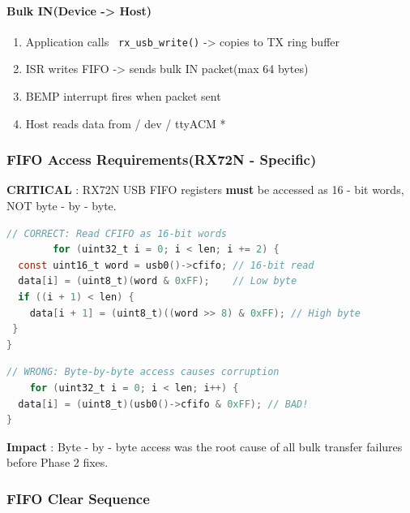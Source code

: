 \paragraph { Bulk IN(Device -> Host)}

\begin{enumerate}
\item Application calls \texttt { rx\_usb\_write()}
-> copies to TX ring buffer
\item ISR writes FIFO -> sends bulk IN packet(max 64 bytes)
\item BEMP interrupt fires when packet sent
\item Host reads data from / dev / ttyACM *
\end{enumerate}

\subsubsection{FIFO Access Requirements(RX72N - Specific)}

\textbf{CRITICAL} : RX72N USB FIFO registers \textbf{must} be accessed as 16 -
                    bit words,
    NOT byte - by -
        byte.

\begin{lstlisting}[language = C,
                    caption = {Correct FIFO Read(16 - bit access)},
                    label = {lst : fifo_read_correct}]
        // CORRECT: Read CFIFO as 16-bit words
        for (uint32_t i = 0; i < len; i += 2) {
  const uint16_t word = usb0()->cfifo; // 16-bit read
  data[i] = (uint8_t)(word & 0xFF);    // Low byte
  if ((i + 1) < len) {
    data[i + 1] = (uint8_t)((word >> 8) & 0xFF); // High byte
 }
}
\end{lstlisting}

\begin{lstlisting}[language = C,
                   caption = {Incorrect FIFO Read(causes data corruption)},
                   label = {lst : fifo_read_wrong}]
    // WRONG: Byte-by-byte access causes corruption
    for (uint32_t i = 0; i < len; i++) {
  data[i] = (uint8_t)(usb0()->cfifo & 0xFF); // BAD!
}
\end{lstlisting}

\textbf{Impact} : Byte - by -
                  byte access was the root cause of all bulk transfer failures
                      before Phase 2 fixes.

\subsubsection{FIFO Clear Sequence}

